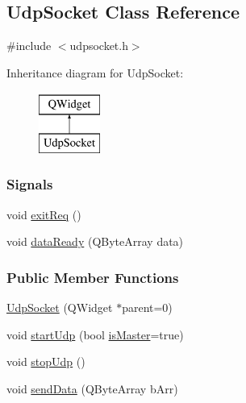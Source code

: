 \hypertarget{classUdpSocket}{}\subsection{Udp\+Socket Class Reference}
\label{classUdpSocket}


{\ttfamily \#include $<$udpsocket.\+h$>$}

Inheritance diagram for Udp\+Socket\+:\begin{figure}[H]
\begin{center}
\leavevmode
\includegraphics[height=2.000000cm]{classUdpSocket}
\end{center}
\end{figure}
\subsubsection*{Signals}
\begin{DoxyCompactItemize}
\item 
void \mbox{\hyperlink{classUdpSocket_a43ebbd10ee3b27bfe0b62b507bf8e2c4}{exit\+Req}} ()
\item 
void \mbox{\hyperlink{classUdpSocket_af24c4f2c6b77c9999e8638aead581477}{data\+Ready}} (Q\+Byte\+Array data)
\end{DoxyCompactItemize}
\subsubsection*{Public Member Functions}
\begin{DoxyCompactItemize}
\item 
\mbox{\hyperlink{classUdpSocket_a25a2f670352d9f600143c370beafd8f6}{Udp\+Socket}} (Q\+Widget $\ast$parent=0)
\item 
void \mbox{\hyperlink{classUdpSocket_aca3bb48ba03494ee09ed46a9e6d27ffb}{start\+Udp}} (bool \mbox{\hyperlink{classUdpSocket_aa5132ded0322787b898fa346a42f7dce}{is\+Master}}=true)
\item 
void \mbox{\hyperlink{classUdpSocket_a508506f2a8a7bbfa04a010ac491f9fa9}{stop\+Udp}} ()
\item 
void \mbox{\hyperlink{classUdpSocket_a1d66f093f85db5ae4df98a57adfeb322}{send\+Data}} (Q\+Byte\+Array b\+Arr)
\end{DoxyCompactItemize}
